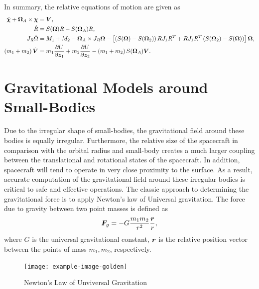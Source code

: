 In summary, the relative equations of motion are given as
\begin{align}
    \dot{\bm{\chi}} + \bm{\Omega}_A \times \bm{\chi} &= \bm{V} ,\\
    \dot{R} &= S(\bm{\Omega}) R - S(\bm{\Omega}_A ) R , \\
    J_R \dot{\Omega} &= M_1 + M_2 - \bm{\Omega}_A \times J_R \bm{\Omega} -\left[ \left( S(\bm{\Omega}) - S(\bm{\Omega}_2) \right) R J_1 R^T + R J_1 R^T \left( S(\bm{\Omega}_2) - S(\bm{\Omega}) \right) \right] \bm{\Omega} , \\
    \left( m_1 + m_2 \right) \dot{\bm{V}} &= m_1 \frac{\partial U}{\partial \bm{z}_1} + m_2 \frac{\partial U}{\partial \bm{z}_2} - \left( m_1 +m_2 \right) S(\bm{\Omega}_A) \bm{V} .
\end{align}

\section{Gravitational Models around Small-Bodies}\label{sec:gravitational_models}
Due to the irregular shape of small-bodies, the gravitational field around these bodies is equally irregular.
Furthermore, the relative size of the spacecraft in comparison with the orbital radius and small-body creates a much larger coupling between the translational and rotational states of the spacecraft.
In addition, spacecraft will tend to operate in very close proximity to the surface.
As a result, accurate computation of the gravitational field around these irregular bodies is critical to safe and effective operations.
The classic approach to determining the gravitational force is to apply Newton's law of Universal gravitation.
The force due to gravity between two point masses is defined as
\begin{align}\label{eq:newton_universal_gravitation}
    \bm{F}_g =  - G \frac{m_1 m_2}{r^2} \frac{\bm{r}}{r},
\end{align}
where \( G \) is the universal gravitational constant, \( \bm{r} \) is the relative position vector between the points of mass \( m_1, m_2\), respectively.

\begin{figure}
    \centering
    \texttt{[image: example-image-golden]}
    \caption{Newton's Law of Unviversal Gravitation~\label{fig:universal_gravity}}
\end{figure}

